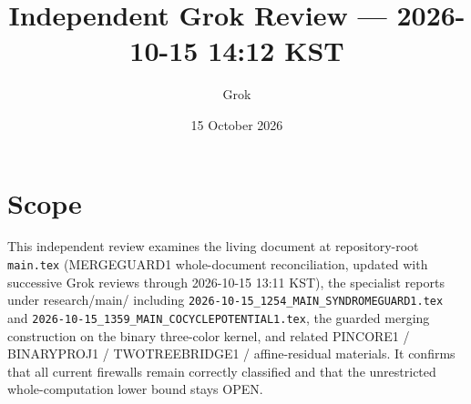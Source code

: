 \documentclass[11pt]{article}
\title{Independent Grok Review --- 2026-10-15 14:12 KST}
\author{Grok}
\date{15 October 2026}
\begin{document}
\maketitle

\begin{center}
\end{center}

\section{Scope}
This independent review examines the living document at repository-root \texttt{main.tex} (MERGEGUARD1 whole-document reconciliation, updated with successive Grok reviews through 2026-10-15 13:11 KST), the specialist reports under research/main/ including \texttt{2026-10-15_1254_MAIN_SYNDROMEGUARD1.tex} and \texttt{2026-10-15_1359_MAIN_COCYCLEPOTENTIAL1.tex}, the guarded merging construction on the binary three-color kernel, and related PINCORE1 / BINARYPROJ1 / TWOTREEBRIDGE1 / affine-residual materials. It confirms that all current firewalls remain correctly classified and that the unrestricted whole-computation lower bound stays OPEN.
\end{document}
